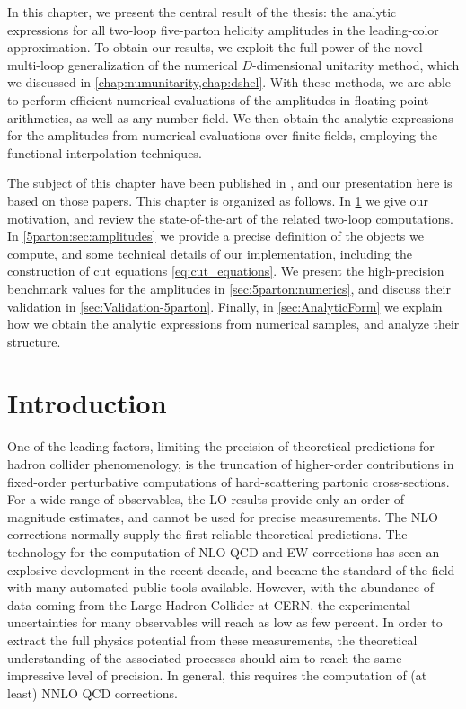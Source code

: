 In this chapter, we present the central result of the thesis:
the analytic expressions for all two-loop five-parton helicity amplitudes in the leading-color approximation.
To obtain our results, we exploit the full power of the novel multi-loop generalization of the numerical $D$-dimensional unitarity method,
which we discussed in \cref{chap:numunitarity,chap:dshel}.
With these methods, we are able to perform efficient numerical evaluations of the amplitudes in floating-point arithmetics, as well as any number field.
We then obtain the analytic expressions for the amplitudes from numerical evaluations over finite fields,
employing the functional interpolation techniques.

The subject of this chapter have been published in \cite{Abreu:2018jgq,Abreu:2019odu},
and our presentation here is based on those papers.
This chapter is organized as follows.
In \cref{5parton:sec:intro} we give our motivation, and review the state-of-the-art of the related two-loop computations.
In \cref{5parton:sec:amplitudes} we provide a precise definition  of the objects we compute,
and some technical details of our implementation, including the construction of cut equations \eqref{eq:cut_equations}.
We present the high-precision benchmark values for the amplitudes in \cref{sec:5parton:numerics},
and discuss their validation in \cref{sec:Validation-5parton}.
Finally, in \cref{sec:AnalyticForm} we explain how we obtain the analytic expressions from numerical samples,
and analyze their structure.

\section{Introduction}
\label{5parton:sec:intro}

One of the leading factors, limiting the precision of theoretical predictions for hadron collider phenomenology,
is the truncation of higher-order contributions in fixed-order perturbative computations of hard-scattering partonic cross-sections.
For a wide range of observables, the LO results provide only an order-of-magnitude estimates,
and cannot be used for precise measurements.
The NLO corrections normally supply the first reliable theoretical predictions.
The technology for the computation of NLO QCD and EW corrections has seen an explosive development
in the recent decade, and became the standard of the field with many automated public tools available.
However, with the abundance of data coming from the Large Hadron Collider at CERN,
the experimental uncertainties for many observables will reach as low as few percent.
In order to extract the full physics potential from these measurements, 
the theoretical understanding of the associated processes should aim to reach the same impressive level of precision.
In general, this requires the computation of (at least) NNLO QCD corrections.


